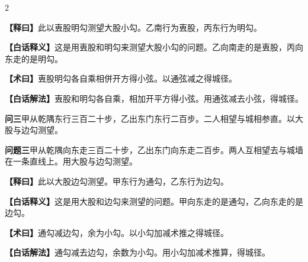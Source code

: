 \documentclass[11pt,a4paper]{article}
\newcommand{\WenQuestion}[1]{\textbf{\textcolor{classicalcolor}{#1}}}
\newcommand{\BaiQuestion}[1]{\textbf{\textcolor{moderncolor}{#1}}}
\newcommand{\WenExplain}{\textcolor{classicalcolor}{\textbf{【释曰】}}}
\newcommand{\BaiExplain}{\textcolor{moderncolor}{\textbf{【白话释义】}}}
\newcommand{\WenMethod}{\textcolor{classicalcolor}{\textbf{【术曰】}}}
\newcommand{\BaiMethod}{\textcolor{moderncolor}{\textbf{【白话解法】}}}
\begin{document}
\begin{paracol}{2}
\switchcolumn*
\begin{tcolorbox}[colback=red!5,colframe=red!30!black,boxrule=0.3pt]
\WenExplain\quad 此以叀股明勾测望大股小勾。乙南行为叀股，丙东行为明勾。
\end{tcolorbox}
\switchcolumn
\begin{tcolorbox}[colback=blue!5,colframe=blue!30!black,boxrule=0.3pt]
\BaiExplain\quad 这是用叀股和明勾来测望大股小勾的问题。乙向南走的是叀股，丙向东走的是明勾。
\end{tcolorbox}

\switchcolumn*
\begin{tcolorbox}[colback=red!5,colframe=red!40!black,boxrule=0.3pt]
\WenMethod\quad 叀股明勾各自乘相併开方得小弦。以通弦减之得城径。
\end{tcolorbox}
\switchcolumn
\begin{tcolorbox}[colback=blue!5,colframe=blue!40!black,boxrule=0.3pt]
\BaiMethod\quad 叀股和明勾各自乘，相加开平方得小弦。用通弦减去小弦，得城径。
\end{tcolorbox}

\vspace{0.8em}

\switchcolumn*
\begin{tcolorbox}[colback=red!3,colframe=red!30!black,boxrule=0.3pt]
\WenQuestion{问三}\quad 甲从乾隅东行三百二十步，乙出东门东行二百步。二人相望与城相参直。以大股与边勾测望。
\end{tcolorbox}
\switchcolumn
\begin{tcolorbox}[colback=blue!3,colframe=blue!30!black,boxrule=0.3pt]
\BaiQuestion{问题三}\quad 甲从乾隅向东走三百二十步，乙出东门向东走二百步。两人互相望去与城墙在一条直线上。用大股与边勾测望。
\end{tcolorbox}

\switchcolumn*
\begin{tcolorbox}[colback=red!5,colframe=red!30!black,boxrule=0.3pt]
\WenExplain\quad 此以大股边勾测望。甲东行为通勾，乙东行为边勾。
\end{tcolorbox}
\switchcolumn
\begin{tcolorbox}[colback=blue!5,colframe=blue!30!black,boxrule=0.3pt]
\BaiExplain\quad 这是用大股和边勾来测望的问题。甲向东走的是通勾，乙向东走的是边勾。
\end{tcolorbox}

\switchcolumn*
\begin{tcolorbox}[colback=red!5,colframe=red!40!black,boxrule=0.3pt]
\WenMethod\quad 通勾减边勾，余为小勾。以小勾加减术推之得城径。
\end{tcolorbox}
\switchcolumn
\begin{tcolorbox}[colback=blue!5,colframe=blue!40!black,boxrule=0.3pt]
\BaiMethod\quad 通勾减去边勾，余数为小勾。用小勾加减术推算，得城径。
\end{tcolorbox}

\end{paracol}
\end{document}
